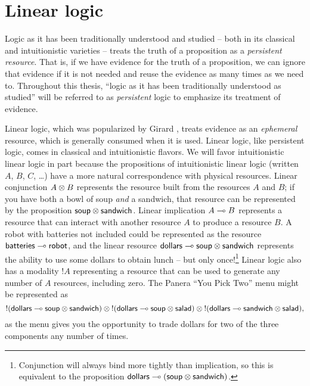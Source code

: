 
\chapter{Linear logic}

Logic as it has been traditionally understood and studied -- both in
its classical and intuitionistic varieties -- treats the truth of a
proposition as a {\it persistent resource}. That is, if we have
evidence for the truth of a proposition, we can ignore that evidence
if it is not needed and reuse the evidence as many times as we need
to. Throughout this thesis, ``logic as it has been traditionally
understood as studied'' will be referred to as {\it persistent} logic
to emphasize its treatment of evidence. 

Linear logic, which was popularized by Girard \cite{girard87linear},
treats evidence as an {\it ephemeral} resource, which is generally
consumed when it is used. Linear logic, like persistent logic, comes
in classical and intuitionistic flavors. We will favor intuitionistic
linear logic in part because the propositions of intuitionistic linear
logic (written $A$, $B$, $C$, \ldots) have a more natural
correspondence with physical resources. Linear conjunction $A \otimes
B$ represents the resource built from the resources $A$ and $B$; if
you have both a bowl of soup {\it and} a sandwich, that resource can
be represented by the proposition ${\sf soup} \otimes {\sf
  sandwich}$. Linear implication $A \multimap B$ represents a resource
that can interact with another resource $A$ to produce a resource
$B$. A robot with batteries not included could be represented as the
resource ${\sf batteries} \multimap {\sf robot}$, and the linear resource
${\sf dollars} \multimap {\sf soup} \otimes {\sf sandwich}$ represents
the ability to use some dollars to obtain lunch -- but only
once!\footnote{Conjunction will always bind more tightly than
  implication, so this is equivalent to the proposition ${\sf dollars}
  \multimap ({\sf soup} \otimes {\sf sandwich})$.} Linear logic also has
a modality ${!}A$ representing a resource that can be used to generate
any number of $A$ resources, including zero. The Panera ``You Pick
Two'' menu might be represented as
\[ {!}({\sf dollars} \multimap {\sf soup} \otimes {\sf sandwich}) \otimes
{!}({\sf dollars} \multimap {\sf soup} \otimes {\sf salad}) \otimes
{!}({\sf dollars} \multimap {\sf sandwich} \otimes {\sf salad}),\] as the
menu gives you the opportunity to trade dollars for two of the three
components any number of times.



